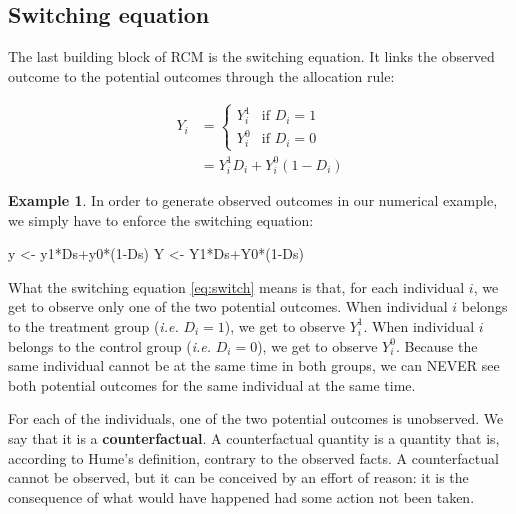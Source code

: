 \documentclass[
]{book}
\newenvironment{Shaded}{\begin{snugshade}}{\end{snugshade}}
\newcommand{\DecValTok}[1]{\textcolor[rgb]{0.00,0.00,0.81}{#1}}
\newcommand{\NormalTok}[1]{#1}
\newcommand{\OtherTok}[1]{\textcolor[rgb]{0.56,0.35,0.01}{#1}}
\newcommand{\SpecialCharTok}[1]{\textcolor[rgb]{0.00,0.00,0.00}{#1}}
\theoremstyle{definition}
\theoremstyle{definition}
\newtheorem{example}{Example}[chapter]
\theoremstyle{definition}
\theoremstyle{definition}
\theoremstyle{remark}
\begin{document}
\hypertarget{switching-equation}{%
\subsection{Switching equation}\label{switching-equation}}

The last building block of RCM is the switching equation.
It links the observed outcome to the potential outcomes through the allocation rule:

\begin{align}
 \label{eq:switch}
  Y_i & = 
    \begin{cases}
    Y_i^1 & \text{if } D_i=1\\
    Y_i^0 & \text{if } D_i=0
    \end{cases} \\
    & = Y_i^1D_i + Y_i^0(1-D_i) \nonumber
\end{align}

\begin{example}
\protect\hypertarget{exm:unnamed-chunk-4}{}{\label{exm:unnamed-chunk-4} }In order to generate observed outcomes in our numerical example, we simply have to enforce the switching equation:
\end{example}

\begin{Shaded}
\begin{Highlighting}[]
\NormalTok{y }\OtherTok{\textless{}{-}}\NormalTok{ y1}\SpecialCharTok{*}\NormalTok{Ds}\SpecialCharTok{+}\NormalTok{y0}\SpecialCharTok{*}\NormalTok{(}\DecValTok{1}\SpecialCharTok{{-}}\NormalTok{Ds)}
\NormalTok{Y }\OtherTok{\textless{}{-}}\NormalTok{ Y1}\SpecialCharTok{*}\NormalTok{Ds}\SpecialCharTok{+}\NormalTok{Y0}\SpecialCharTok{*}\NormalTok{(}\DecValTok{1}\SpecialCharTok{{-}}\NormalTok{Ds)}
\end{Highlighting}
\end{Shaded}

What the switching equation \eqref{eq:switch} means is that, for each individual \(i\), we get to observe only one of the two potential outcomes.
When individual \(i\) belongs to the treatment group (\emph{i.e.} \(D_i=1\)), we get to observe \(Y_i^1\).
When individual \(i\) belongs to the control group (\emph{i.e.} \(D_i=0\)), we get to observe \(Y_i^0\).
Because the same individual cannot be at the same time in both groups, we can NEVER see both potential outcomes for the same individual at the same time.

For each of the individuals, one of the two potential outcomes is unobserved.
We say that it is a \textbf{counterfactual}.
A counterfactual quantity is a quantity that is, according to Hume's definition, contrary to the observed facts.
A counterfactual cannot be observed, but it can be conceived by an effort of reason: it is the consequence of what would have happened had some action not been taken.
\end{document}
